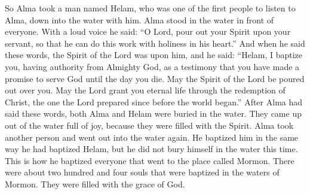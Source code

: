 So Alma took a man named Helam, who was one of the first people to listen to Alma, down into the water with him. Alma stood in the water in front of everyone. With a loud voice he said: ``O Lord, pour out your Spirit upon your servant, so that he can do this work with holiness in his heart.''
\bverse \iffalse And when he had said these words, the Spirit of the Lord was upon him, and he said: Helam, I baptize thee, having authority from the Almighty God, as a testimony that ye have entered into a covenant to serve him until you are dead as to the mortal body; and may the Spirit of the Lord be poured out upon you; and may he grant unto you eternal life, through the redemption of Christ, whom he has prepared from the foundation of the world. \fi
And when he said these words, the Spirit of the Lord was upon him, and he said: ``Helam, I baptize you, having authority from Almighty God, as a testimony that you have made a promise to serve God until the day you die. May the Spirit of the Lord be poured out over you. May the Lord grant you eternal life through the redemption of Christ, the one the Lord prepared since before the world began.''
\bverse \iffalse And after Alma had said these words, both Alma and Helam were buried in the water; and they arose and came forth out of the water rejoicing, being filled with the Spirit. \fi
After Alma had said these words, both Alma and Helam were buried in the water. They came up out of the water full of joy, because they were filled with the Spirit.
\bverse \iffalse And again, Alma took another, and went forth a second time into the water, and baptized him according to the first, only he did not bury himself again in the water. \fi
Alma took another person and went out into the water again. He baptized him in the same way he had baptized Helam, but he did not bury himself in the water this time.
\bverse \iffalse And after this manner he did baptize every one that went forth to the place of Mormon; and they were in number about two hundred and four souls; yea, and they were baptized in the waters of Mormon, and were filled with the grace of God. \fi
This is how he baptized everyone that went to the place called Mormon. There were about two hundred and four souls that were baptized in the waters of Mormon. They were filled with the grace of God.
\bverse \iffalse And they were called the church of God, or the church of Christ, from that time forward. And it came to pass that whosoever was baptized by the power and authority of God was added to his church. \fi
